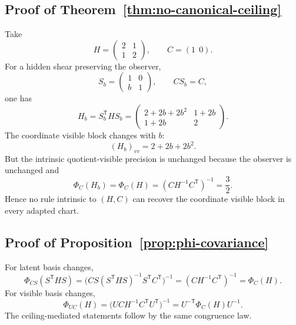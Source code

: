 \documentclass[11pt,a4paper]{article}
\numberwithin{equation}{section}
\theoremstyle{thmcompact}
\theoremstyle{remark}
\begin{document}
\subsection*{Proof of Theorem~\ref{thm:no-canonical-ceiling}}
Take
\begin{equation}
H=
\begin{pmatrix}
2 & 1\\
1 & 2
\end{pmatrix},
\qquad
C=(1\ \ 0).
\end{equation}
For a hidden shear preserving the observer,
\begin{equation}
S_b=
\begin{pmatrix}
1 & 0\\
b & 1
\end{pmatrix},
\qquad CS_b=C,
\end{equation}
one has
\begin{equation}
H_b=S_b^{\mathsf T}HS_b=
\begin{pmatrix}
2+2b+2b^2 & 1+2b\\
1+2b & 2
\end{pmatrix}.
\end{equation}
The coordinate visible block changes with $b$:
\begin{equation}
(H_b)_{vv}=2+2b+2b^2.
\end{equation}
But the intrinsic quotient-visible precision is unchanged because the observer is unchanged and
\begin{equation}
\Phi_C(H_b)=\Phi_C(H)=(CH^{-1}C^{\mathsf T})^{-1}=\frac32.
\end{equation}
Hence no rule intrinsic to $(H,C)$ can recover the coordinate visible block in every adapted chart.

\subsection*{Proof of Proposition~\ref{prop:phi-covariance}}
For latent basis changes,
\begin{equation}
\Phi_{CS}(S^{\mathsf T}HS)
=
\bigl(CS(S^{\mathsf T}HS)^{-1}S^{\mathsf T}C^{\mathsf T}\bigr)^{-1}
=
(CH^{-1}C^{\mathsf T})^{-1}
=
\Phi_C(H).
\end{equation}
For visible basis changes,
\begin{equation}
\Phi_{UC}(H)=\bigl(UC H^{-1}C^{\mathsf T}U^{\mathsf T}\bigr)^{-1}=U^{-\mathsf T}\Phi_C(H)U^{-1}.
\end{equation}
The ceiling-mediated statements follow by the same congruence law.
\end{document}
